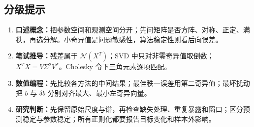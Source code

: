 \subsection*{分级提示}
\begingroup\small
\begin{enumerate}[nosep,leftmargin=*]
  \item \textbf{口述概念：}把参数空间和观测空间分开；先问矩阵是否方阵、对称、正定、满秩，再选分解。小奇异值是问题敏感性，算法稳定性则看后向误差。
  \item \textbf{笔试推导：}残差属于 $\mathcal N(X^T)$；SVD 中只对非零奇异值取倒数；$X^TX=V\Sigma^2V^T$。Cholesky 令下三角元素逐项匹配。
  \item \textbf{数值编程：}先比较各方法的中间结果；最佳秩一误差用第二奇异值；最坏扰动把 $b$ 与 $\delta b$ 分别对齐最大、最小左奇异向量。
  \item \textbf{研究判断：}先保留原始尺度与谱，再检查缺失处理、重复暴露和窗口；区分预测稳定与参数稳定；所有正则化都要报告目标变化和样本外影响。
\end{enumerate}
\endgroup


\MFQMappedUpperChSixHints
